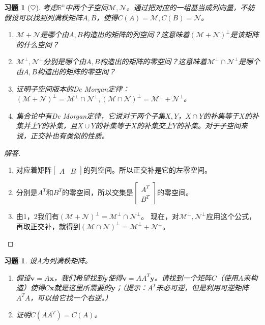 \documentclass[UTF8]{ctexart}
\newcommand{\Ker}{N}
\newtheorem{ex}[thm]{习题}
\begin{document}
\begin{ex}[$\heartsuit $]
考虑$\mathbb{R}^n$中两个子空间$\mathcal{M},\mathcal{N}$。通过把对应的一组基当成列向量，不妨假设可以找到列满秩矩阵$A,B$，使得$C(A)=\mathcal{M}, C(B)=\mathcal{N}$。
\begin{enumerate}
\item $\mathcal{M}+\mathcal{N}$是哪个由$A,B$构造出的矩阵的列空间？这意味着$(\mathcal{M}+\mathcal{N})^\perp$是该矩阵的什么空间？
\item $\mathcal{M}^\perp,\mathcal{N}^\perp$分别是哪个由$A,B$构造出的矩阵的零空间？这意味着$\mathcal{M}^\perp\cap\mathcal{N}^\perp$是哪个由$A,B$构造出的矩阵的零空间？
\item 证明子空间版本的De Morgan定律：$(\mathcal{M}+\mathcal{N})^\perp=\mathcal{M}^\perp\cap\mathcal{N}^\perp,(\mathcal{M}\cap\mathcal{N})^\perp=\mathcal{M}^\perp+\mathcal{N}^\perp$。
\item[注记:] 集合论中有De Morgan定律，它说对于两个子集$X,Y$，$X\cap Y$的补集等于$X$的补集并上$Y$的补集，且$X\cup Y$的补集等于$X$的补集交上$Y$的补集。对于子空间来说，正交补也有类似的性质。
\end{enumerate}
\end{ex}

\begin{proof}[解答]
\begin{enumerate}
\item 对应着矩阵$\begin{bmatrix}A&B\end{bmatrix}$的列空间。所以正交补是它的左零空间。
\item 分别是$A^T$和$B^T$的零空间，所以交集是$\begin{bmatrix}A^T\\B^T\end{bmatrix}$的零空间。
\item 由1，2我们有$(\mathcal{M}+\mathcal{N})^\perp=\mathcal{M}^\perp\cap\mathcal{N}^\perp$。 现在，对$\mathcal{M}^\perp,\mathcal{N}^\perp$应用这个公式，再取正交补，就得到$(\mathcal{M}\cap\mathcal{N})^\perp=\mathcal{M}^\perp+\mathcal{N}^\perp$。
\end{enumerate}
\end{proof}


\begin{ex}
设$A$为列满秩矩阵。
\begin{enumerate}
\item 假设$\bm v=A\bm x$，我们希望找到$\bm y$使得$\bm v=AA^T\bm y$。请找到一个矩阵$C$（使用$A$来构造）使得$C\bm x$就是这里所需要的$\bm y$；（提示：$A^T$未必可逆，但是利用可逆矩阵$A^TA$，可以给它找一个右逆。）
\item 证明$C(AA^T)=C(A)$。
\end{enumerate}
\end{ex}
\end{document}

